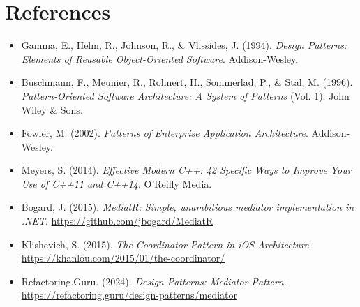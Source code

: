 \documentclass[12pt,a4paper]{article}
\begin{document}
\newpage
\section*{References}
\begin{itemize}
    \item Gamma, E., Helm, R., Johnson, R., \& Vlissides, J. (1994). \textit{Design Patterns: Elements of Reusable Object-Oriented Software}. Addison-Wesley.
    \item Buschmann, F., Meunier, R., Rohnert, H., Sommerlad, P., \& Stal, M. (1996). \textit{Pattern-Oriented Software Architecture: A System of Patterns} (Vol. 1). John Wiley \& Sons.
    \item Fowler, M. (2002). \textit{Patterns of Enterprise Application Architecture}. Addison-Wesley.
    \item Meyers, S. (2014). \textit{Effective Modern C++: 42 Specific Ways to Improve Your Use of C++11 and C++14}. O'Reilly Media.
    \item Bogard, J. (2015). \textit{MediatR: Simple, unambitious mediator implementation in .NET}. \url{https://github.com/jbogard/MediatR}
    \item Klishevich, S. (2015). \textit{The Coordinator Pattern in iOS Architecture}. \url{https://khanlou.com/2015/01/the-coordinator/}
    \item Refactoring.Guru. (2024). \textit{Design Patterns: Mediator Pattern}. \url{https://refactoring.guru/design-patterns/mediator}
\end{itemize}
\end{document}
